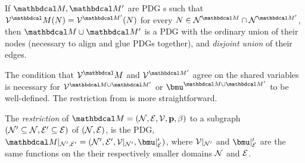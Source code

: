 \begin{vfull}
\begin{defn}[union] \label{def:model-union}
	If $\dg M, \dg M'$ are PDG s such that $\V^\dg M(N) = \V^{\dg M'}(N)$ for every $N \in  \N^{\dg M} \cap \N^{\dg M'}$, then $\dg M \cup \dg M'$ is a PDG with the ordinary union of their nodes (necessary to align and glue PDGs together), and \emph{disjoint union} of their edges. 
\end{defn}
The condition that $\V^\dg M$ and $\V^{\dg M'}$ agree on the shared variables is necessary for $\V^{\dg M\cup \dg M'}$ or $\bmu^{\dg M \cup \dg M'}$ to be well-defined.%
The restriction from  is more straightforward.%

\begin{defn}[restriction]\label{def:restriction}
	The \emph{restriction} of $\dg M = \pdgvars[]$ to a subgraph $(\mathcal N' \subseteq \mathcal N, \mathcal E' \subseteq \mathcal E)$ of $(\mathcal N, \mathcal E)$, is the PDG, $\dg M|_{\N', \Ed'} = (\N', \Ed', \V |_{\N'}, \bmu|_\Ed')$, where 
	$\mathcal V|_{\mathcal N'}$ and $\bmu|_\Ed'$ are the same functions on the their respectively smaller domains $\mathcal N$ and $\mathcal E$. 
\end{defn}




\end{vfull}
